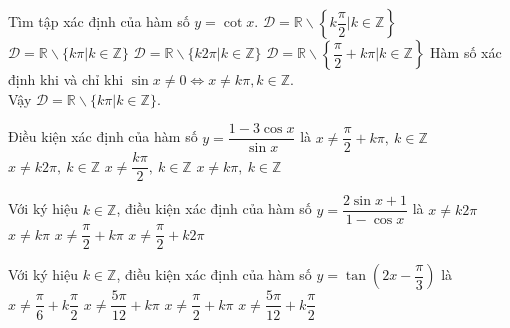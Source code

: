 \begin{ex}%
	Tìm tập xác định của hàm số $ y = \cot x $.
	\choice
	{$ \mathscr D = \mathbb{R} \backslash \left\lbrace k\dfrac{\pi}{2} | k \in \mathbb{Z} \right\rbrace $}
	{\True $ \mathscr D = \mathbb{R} \backslash \{k\pi | k \in \mathbb{Z} \} $}
	{$ \mathscr D = \mathbb{R} \backslash \{k2\pi | k \in \mathbb{Z} \} $}
	{$ \mathscr D = \mathbb{R} \backslash \left\lbrace\dfrac{\pi}{2} + k \pi  | k \in \mathbb{Z} \right\rbrace $}
	\loigiai
	{
		Hàm số xác định khi và chỉ khi $\sin x \ne 0 \Leftrightarrow x \ne k \pi, k \in \mathbb{Z}.$\\
		Vậy $ \mathscr D = \mathbb{R} \backslash \{k\pi | k \in \mathbb{Z} \} $.
	}
\end{ex}

\begin{ex}%
	Điều kiện xác định của hàm số $y=\dfrac{1-3\cos x}{\sin x}$ là
	\choice
	{$x\ne \dfrac{\pi}{2}+k\pi,~k\in\mathbb{Z}$}
	{$x\ne k2\pi,~k\in\mathbb{Z}$}
	{$x\ne \dfrac{k\pi}{2},~k\in\mathbb{Z}$}
	{\True $x\ne k\pi,~k\in\mathbb{Z}$}
\end{ex}

\begin{ex}%
	Với ký hiệu $k\in \mathbb{Z}$, điều kiện xác định của hàm số $y=\dfrac{2\sin x+1}{1-\cos x}$ là
	\choice
	{\True $x\ne k2\pi $}
	{$x\ne k\pi $}
	{$x\ne \dfrac{\pi}{2}+k\pi $}
	{$x\ne \dfrac{\pi}{2}+k2\pi $}
\end{ex}
\begin{ex}%
	Với ký hiệu $k \in \mathbb{Z}$, điều kiện xác định của hàm số $y=\tan \left(2x-\dfrac{\pi}{3}\right)$ là
	\choice
	{$x\ne \dfrac{\pi}{6}+k\dfrac{\pi}{2}$}
	{$x\ne \dfrac{5\pi}{12}+k\pi $}
	{$x\ne \dfrac{\pi}{2}+k\pi $}
	{\True $x\ne \dfrac{5\pi}{12}+k\dfrac{\pi}{2}$}
\end{ex}

